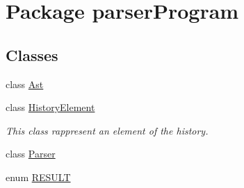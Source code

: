 \hypertarget{namespaceparser_program}{\section{Package parser\-Program}
\label{namespaceparser_program}
}
\subsection*{Classes}
\begin{DoxyCompactItemize}
\item 
class \hyperlink{classparser_program_1_1_ast}{Ast}
\item 
class \hyperlink{classparser_program_1_1_history_element}{History\-Element}
\begin{DoxyCompactList}\small\item\em This class rappresent an element of the history. \end{DoxyCompactList}\item 
class \hyperlink{classparser_program_1_1_parser}{Parser}
\item 
enum \hyperlink{enumparser_program_1_1_r_e_s_u_l_t}{R\-E\-S\-U\-L\-T}
\end{DoxyCompactItemize}
